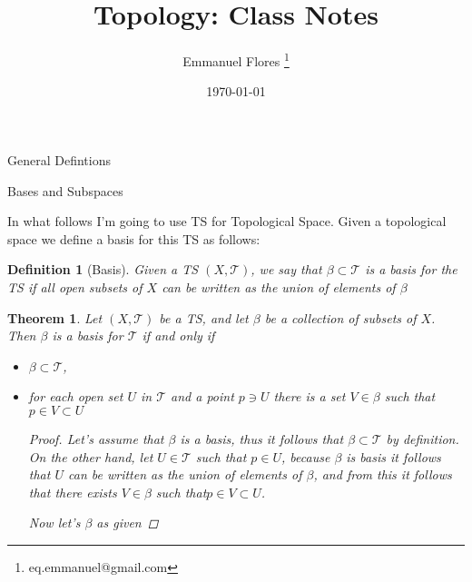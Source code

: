 \documentclass[12pt]{article}
\title{Topology: Class Notes}
\author{Emmanuel Flores \thanks{eq.emmanuel@gmail.com}}
\date{\today}
\newtheorem{definition}{Definition}
\newtheorem{theorem}{Theorem}
\begin{document}
\maketitle

\begin{section}{General Defintions}

\end{section}





\begin{section}{Bases and Subspaces}

In what follows I'm going to use TS for Topological Space. Given a topological space we define a basis for this TS as follows:

\begin{definition}[Basis]
Given a TS $\left( X, \mathcal{T}\right)$, we say that $\mathcal{\beta}\subset\mathcal{T}$ is a basis for the TS if all open subsets of $X$ can be written as the union of elements of $\mathcal{\beta}$
\end{definition}

\begin{theorem}
Let $\left( X, \mathcal{T}\right)$ be a TS, and let $\mathcal{\beta}$ be a collection of subsets of $X$. Then $\mathcal{\beta}$ is a basis for $\mathcal{T}$ if and only if
\begin{itemize}
	\item $\mathcal{\beta}\subset\mathcal{T}$,
	\item for each open set $U$ in $\mathcal{T}$ and a point $p\ni U$ there is a set $V\in\mathcal{\beta}$ such that $p\in V\subset U$

\begin{proof}
Let's assume that $\mathcal{\beta}$ is a basis, thus it follows that $\mathcal{\beta}\subset\mathcal{T}$ by definition. On the other hand, let $U\in\mathcal{T}$ such that $p\in U$, because $\mathcal{\beta}$ is basis it follows that $U$ can be written as the union of elements of $\mathcal{\beta}$, and from this it follows that there exists $V\in\mathcal{\beta}$ such that$p\in V\subset U$.

Now let's $\mathcal{\beta}$ as given 
\end{proof}	
	
\end{itemize}
\end{theorem}
\end{section}
\end{document}
